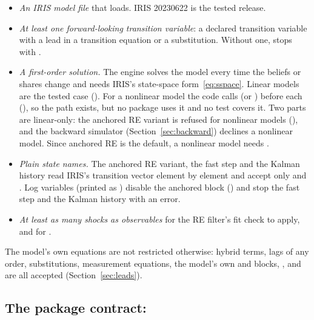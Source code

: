 \documentclass[11pt,a4paper]{article}
\DeclareRobustCommand{\codem}[1]{\texttt{\detokenize{#1}}}
\begin{document}
\begin{itemize}
  \item \emph{An IRIS model file} that  loads. IRIS 20230622 is the
        tested release.
  \item \emph{At least one forward-looking transition variable}: a declared transition
        variable with a lead in a transition equation or a substitution. Without one,
         stops with .
  \item \emph{A first-order solution.} The engine solves the model every time the beliefs or
        shares change and needs IRIS's state-space form~\eqref{eq:sspace}. Linear models are
        the tested case (). For a nonlinear model the code calls
         (or ) before each 
        (), so the path exists, but no package uses it and no test
        covers it. Two parts are linear-only: the anchored RE variant is refused for
        nonlinear models (), and the backward simulator
        (Section~\ref{sec:backward}) declines a nonlinear model. Since anchored RE is the
        default, a nonlinear model needs .
  \item \emph{Plain state names.} The anchored RE variant, the fast step and the Kalman
        history read IRIS's transition vector element by element and accept only  and
        . Log variables (printed as ) disable the anchored block
        () and stop the fast step and the Kalman history with an
        error.
  \item \emph{At least as many shocks as observables} for the RE filter's fit check to apply,
        and for .
\end{itemize}

The model's own equations are not restricted otherwise: hybrid terms, lags of any order,
substitutions, measurement equations, the model's own  and  blocks,
,  and  are all accepted (Section~\ref{sec:leads}).

\subsection{The package contract: \texorpdfstring{\codem{model_spec.m}}{model\_spec.m}}\label{sec:spec}
\end{document}
